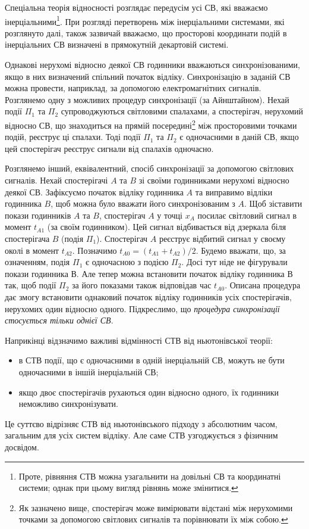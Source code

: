 Спеціальна теорія відносності розглядає передусім усі СВ, які  вважаємо інерціальними\footnote{Проте, рівняння СТВ можна
узагальнити на довільні СВ та координатні системи; однак при цьому вигляд рівнянь може змінитися.}. При розгляді
перетворень між інерціальними системами, які розглянуто далі, також зазвичай вважаємо, що просторові координати подій в
інерціальних СВ визначені в прямокутній декартовій системі.

Однакові нерухомі відносно деякої СВ годинники вважаються синхронізованими, якщо в них визначений спільний початок
відліку. Синхронізацію в заданій СВ можна провести, наприклад, за допомогою електромагнітних сигналів. Розглянемо одну з
можливих процедур синхронізації (за Айнштайном). Нехай події $Π_1$ та $Π_2$ супроводжуються світловими спалахами, а
спостерігач, нерухомий відносно СВ, що знаходиться на прямій посередині\footnote{Як зазначено вище, спостерігач може
вимірювати відстані між нерухомими точками  за допомогою світлових сигналів та порівнювати їх між собою.} між
просторовими точками подій, реєструє ці спалахи. Тоді події $Π_1$ та $Π_2$ є одночасними в даній СВ, якщо цей
спостерігач реєструє сигнали від спалахів одночасно.

Розглянемо інший, еквівалентний, спосіб синхронізації за допомогою світлових сигналів. Нехай спостерігачі $A$ та $B$ зі
своїми годинниками нерухомі відносно деякої СВ. Зафіксуємо початок відліку годинника $A$ та виправимо відліки годинника
$B$, щоб можна було вважати його синхронізованим з $A$. Щоб зіставити покази годинників $A$ та $B$, спостерігач $A$ у
точці $x_A$ посилає світловий сигнал в момент $t_{A1}$ (за своїм годинником). Цей сигнал відбивається від дзеркала біля
спостерігача $B$ (подія $\Pi_1$). Спостерігач $A$ реєструє відбитий сигнал у своєму околі в момент $t_{A2}$. Позначимо
$t_{A0}= (t_{A1}+t_{A2})/2$. Будемо вважати, що, за означенням, подія $Π_1$ є одночасною з подією $Π_2$. Досі тут ніде
не фігурували покази годинника В. Але тепер можна встановити початок відліку годинника В так, щоб події $\Pi_2$ за його
показами також відповідав час $t_{A0}$. Описана процедура дає змогу встановити однаковий початок відліку годинників усіх
спостерігачів, нерухомих один відносно одного. Підкреслимо, що \emph{процедура синхронізації стосується тільки однієї
СВ}.

Наприкінці відзначимо важливі відмінності СТВ від ньютонівської теорії:
\begin{itemize}
	\item[(i)] в СТВ події, що є одночасними в одній інерціальній СВ, можуть не бути одночасними в іншій інерціальній
	СВ;
	\item[(ii)] якщо двоє спостерігачів рухаються один відносно одного, їх годинники неможливо синхронізувати.
\end{itemize}
Це суттєво відрізняє СТВ від ньютонівського підходу з абсолютним часом, загальним для усіх систем відліку. Але саме СТВ
узгоджується з фізичним досвідом.


